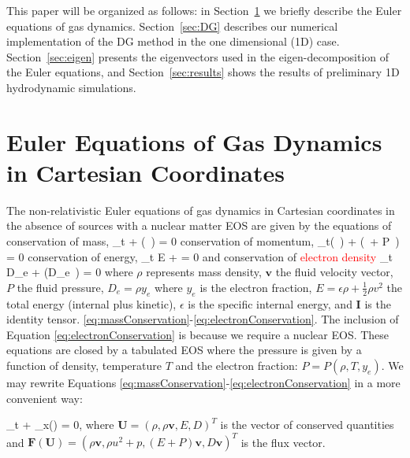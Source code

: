 \documentclass[onecolumn]{aastex62}
\begin{document}
This paper will be organized as follows: in Section~\ref{sec:eulereq} we briefly
describe the Euler equations of gas dynamics. Section~\ref{sec:DG} describes our
numerical implementation of the DG method in the one dimensional (1D) case.
Section~\ref{sec:eigen} presents the eigenvectors used in the eigen-decomposition
of the Euler equations, and Section~\ref{sec:results}
shows the results of preliminary 1D hydrodynamic simulations.

\section{Euler Equations of Gas Dynamics in Cartesian Coordinates}
\label{sec:eulereq}
The non-relativistic Euler equations of gas dynamics
\citep[see, e.g.,][for details]{leveque:2002} in Cartesian coordinates
in the absence of sources with a nuclear matter EOS are given by
the equations of conservation of mass,
\beq
  \partial_{t} \rho + \divergence{} (\rho\,  ) = 0
  \label{eq:massConservation}
\eeq
conservation of momentum,
\beq
  \partial_{t}(\rho\,  ) + \divergence{}(\rho\,   \otimes {} + P\, ) = 0
  \label{eq:momentumConservation}
\eeq
conservation of energy,
\beq
  \partial_{t} E + \divergence{} = 0
  \label{eq:energyConservation}
\eeq
and conservation of \textcolor{red}{electron density}
\beq
  \partial_{t} D_{e} + \divergence{}(D_{e}\, ) = 0
  \label{eq:electronConservation}
\eeq
where $\rho$ represents mass density, $\mathbf{v}$ the fluid velocity vector,
$P$ the fluid pressure, $D_{e}=\rho y_e$ where $y_e$ is the electron fraction,
$E=\epsilon \rho +\frac{1}{2}\rho v^2$ the total energy (internal plus kinetic),
$\epsilon$ is the specific internal energy, and $\mathbf{I}$ is the identity tensor.
\eqref{eq:massConservation}-\eqref{eq:electronConservation}. The inclusion of
Equation \eqref{eq:electronConservation} is because we require a nuclear EOS.
These equations are closed by a tabulated EOS where the pressure is given by a function of
density, temperature $T$ and the electron fraction: $P = P(\rho, T, y_e)$.
We may rewrite Equations \eqref{eq:massConservation}-\eqref{eq:electronConservation}
in a more convenient way:

\beq
  \partial_{t} + \partial_{x}() = 0,
  \label{eq:conservation}
\eeq
where $\mathbf{U} =(\rho,\rho \mathbf{v},E, D)^{T}$ is the vector of conserved quantities
and $\mathbf{F}(\mathbf{U})=(\rho \mathbf{v},\rho u^{2}+p,(E+P)\mathbf{v}, D\mathbf{v})^{T}$
is the flux vector.
\end{document}

